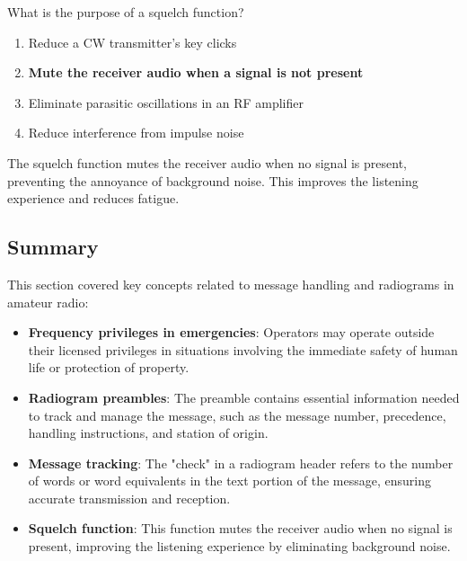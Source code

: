 
\begin{tcolorbox}[colback=gray!10!white,colframe=black!75!black,title={T2B13}]
    What is the purpose of a squelch function?
    \begin{enumerate}[label=\Alph*,noitemsep]
        \item Reduce a CW transmitter's key clicks
        \item \textbf{Mute the receiver audio when a signal is not present}
        \item Eliminate parasitic oscillations in an RF amplifier
        \item Reduce interference from impulse noise
    \end{enumerate}
\end{tcolorbox}

The squelch function mutes the receiver audio when no signal is present, preventing the annoyance of background noise. This improves the listening experience and reduces fatigue.


\subsection*{Summary}

This section covered key concepts related to message handling and radiograms in amateur radio:

\begin{itemize}
    \item \textbf{Frequency privileges in emergencies}: Operators may operate outside their licensed privileges in situations involving the immediate safety of human life or protection of property.
    \item \textbf{Radiogram preambles}: The preamble contains essential information needed to track and manage the message, such as the message number, precedence, handling instructions, and station of origin.
    \item \textbf{Message tracking}: The "check" in a radiogram header refers to the number of words or word equivalents in the text portion of the message, ensuring accurate transmission and reception.
    \item \textbf{Squelch function}: This function mutes the receiver audio when no signal is present, improving the listening experience by eliminating background noise.
\end{itemize}
